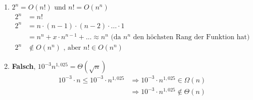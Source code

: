 \begin{enumerate}[nolistsep, noitemsep, label=\alph*)]
        \item $2^n = O(n!)$ und $n! = O(n^n)$ \begin{align*}
                2^n &= n! \\
                2^n &= n \cdot (n - 1) \cdot (n - 2) \cdot ... \cdot 1 \\
                    &= n^n + x \cdot n^{n-1} + ... \approx n^n \text{ (da $n^n$ den höchsten Rang der Funktion hat)} \\
                2^n &\not\in O(n^n) \text{ , aber } n! \in O(n^n)
            \end{align*}
		\item \textbf{Falsch}, $10^{-3}n^{1,025} = \Theta(\sqrt{n})$ \begin{align*}
        		10^{-3} \cdot n \leq 10^{-3} \cdot n^{1,025} &\Rightarrow 10^{-3} \cdot n^{1,025} \in \Omega(n) \\
                &\Rightarrow 10^{-3} \cdot n^{1,025} \not\in \Theta(n)
			\end{align*}
    \end{enumerate}